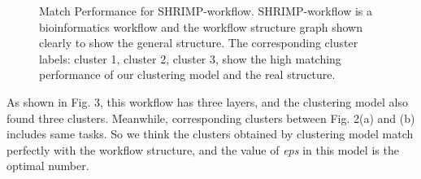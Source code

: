 \documentclass[conference]{IEEEtran}
\begin{document}
\begin{figure}[htbp]
  \centering 
  \caption{Match Performance for SHRIMP-workflow. SHRIMP-workflow is a bioinformatics workflow and the workflow structure graph shown clearly to show the general structure. The corresponding cluster labels: cluster 1, cluster 2, cluster 3, show the high matching performance of our clustering model and the real structure. } 
\end{figure}

As shown in Fig. 3, this workflow has three layers, and the clustering model also found three clusters. Meanwhile, corresponding clusters between Fig. 2(a) and (b) includes same tasks. So we think the clusters obtained by clustering model match perfectly with the workflow structure, and the value of \emph{eps} in this model is the optimal number.
\end{document}
